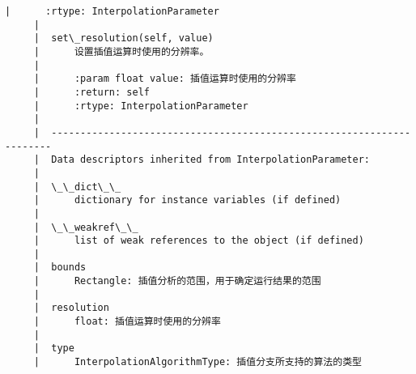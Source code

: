 \documentclass[11pt]{article}
\begin{document}
\begin{Verbatim}[commandchars=\\\{\}]
     |      :rtype: InterpolationParameter
     |  
     |  set\_resolution(self, value)
     |      设置插值运算时使用的分辨率。
     |      
     |      :param float value: 插值运算时使用的分辨率
     |      :return: self
     |      :rtype: InterpolationParameter
     |  
     |  ----------------------------------------------------------------------
     |  Data descriptors inherited from InterpolationParameter:
     |  
     |  \_\_dict\_\_
     |      dictionary for instance variables (if defined)
     |  
     |  \_\_weakref\_\_
     |      list of weak references to the object (if defined)
     |  
     |  bounds
     |      Rectangle: 插值分析的范围，用于确定运行结果的范围
     |  
     |  resolution
     |      float: 插值运算时使用的分辨率
     |  
     |  type
     |      InterpolationAlgorithmType: 插值分支所支持的算法的类型
    

\end{Verbatim}
\end{document}
